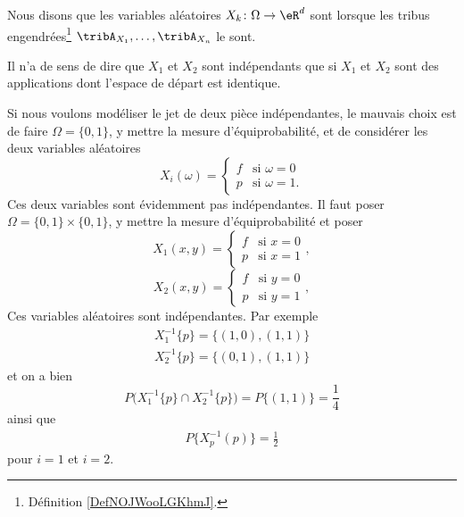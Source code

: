\begin{definition}  \label{DefNJUkotc}
    Nous disons que les variables aléatoires \( X_k\colon \Omega\to \eR^d\) sont  lorsque les tribus engendrées\footnote{Définition \ref{DefNOJWooLGKhmJ}.} \( \tribA_{X_1},\ldots,\tribA_{X_n}\) le sont.
\end{definition}

\begin{remark}
	Il n'a de sens de dire que \( X_1\) et \( X_2\) sont indépendants que si \( X_1\) et \( X_2\) sont des applications dont l'espace de départ est identique.

	Si nous voulons modéliser le jet de deux pièce indépendantes, le mauvais choix est de faire \( \Omega=\{ 0,1 \}\), y mettre la mesure d'équiprobabilité, et de considérer les deux variables aléatoires
	\begin{equation}
		X_i(\omega)=\begin{cases}
			f & \text{si } \omega=0  \\
			p & \text{si } \omega=1.
		\end{cases}
	\end{equation}
	Ces deux variables sont évidemment pas indépendantes. Il faut poser \( \Omega=\{ 0,1 \}\times \{ 0,1 \}\), y mettre la mesure d'équiprobabilité et poser
	\begin{equation}
		X_1(x,y)=\begin{cases}
			f & \text{si } x=0 \\
			p & \text{si } x=1
		\end{cases},
	\end{equation}
	\begin{equation}
		X_2(x,y)=\begin{cases}
			f & \text{si } y=0 \\
			p & \text{si } y=1
		\end{cases},
	\end{equation}
	Ces variables aléatoires sont indépendantes. Par exemple
	\begin{subequations}
		\begin{align}
			X_1^{-1}\{ p \}=\{ (1,0),(1,1) \} \\
			X_2^{-1}\{ p \}=\{ (0,1),(1,1) \}
		\end{align}
	\end{subequations}
	et on a bien
	\begin{equation}
		P\big( X_1^{-1}\{ p \}\cap X_2^{-1}\{ p \} \big)=P\{ (1,1) \}=\frac{1}{ 4 }
	\end{equation}
	ainsi que
	\begin{subequations}
		\begin{align}
			P\{ X_p^{-1}(p) \}=\frac{ 1 }{2}
		\end{align}
	\end{subequations}
	pour \( i=1\) et \( i=2\).
\end{remark}

